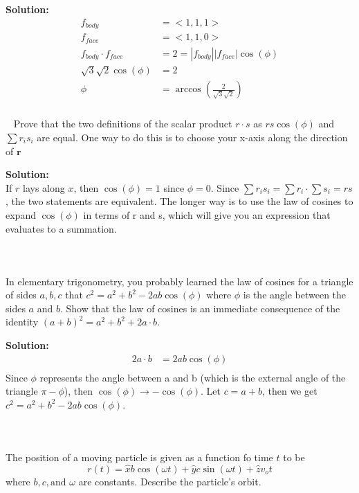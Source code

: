 \documentclass{article}
\newcommand\Problem{%
    \subsubsection{}~%
}
\newcommand\TheSolution{%
  \textbf{Solution:}\\%
}
\begin{document}
\TheSolution
\begin{equation}
    \begin{aligned}
        f_{body}                & = <1,1,1>                            \\
        f_{face}                & = <1,1,0>                            \\
        f_{body} \cdot f_{face} & = 2 = |f_{body}||f_{face}|\cos(\phi) \\
        \sqrt3\sqrt2\cos(\phi)  & = 2                                  \\
        \phi                    & = \arccos(\frac{2}{\sqrt3\sqrt2})
    \end{aligned}
\end{equation}
\begin{center}
    \boxed{35.26\deg}
\end{center}

\Problem Prove that the two definitions of the scalar product $r \cdot s$ as $rs\cos(\phi)$ and $\sum r_i s_i$ are equal. One way to do this is to choose your x-axis along the direction of $\boldsymbol{r}$

\TheSolution
If $r$ lays along $x$, then $\cos(\phi) = 1$ since $\phi = 0$. Since $\sum r_i s_i = \sum r_i \cdot \sum s_i = rs$, the two statements are equivalent. The longer way is to use the law of cosines to expand $\cos(\phi)$ in terms of r and s, which will give you an expression that evaluates to a summation.

\Problem
In elementary trigonometry, you probably learned the law of cosines for a triangle of sides $a, b, c$ that $c^2 = a^2 + b^2 - 2ab\cos(\phi)$ where $\phi$ is the angle between the sides $a$ and $b$. Show that the law of cosines is an immediate consequence of the identity $(a + b)^2 = a^2 + b^2 + 2 a \cdot b$.

\TheSolution
\begin{equation}
    \begin{aligned}
        2a \cdot b & = 2ab\cos(\phi) \\
    \end{aligned}
\end{equation}
Since $\phi$ represents the angle between a and b (which is the external angle of the triangle $\pi - \phi$), then $\cos(\phi) \rightarrow -\cos(\phi)$. Let $c = a + b$, then we get $c^2 = a^2 + b^2 - 2ab\cos(\phi)$.

\Problem
The position of a moving particle is given as a function fo time $t$ to be
\[r(t) = \hat{x}b\cos(\omega t) + \hat{y}c\sin(\omega t) + \hat{z}v_o t\]
where $b, c, \text{and } \omega$ are constants. Describe the particle's orbit.
\end{document}
